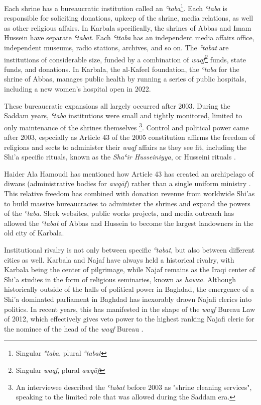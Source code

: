 Each shrine has a bureaucratic institution called an \emph{ʿtaba}\footnote{Singular \emph{ʿtaba}, plural \emph{ʿtabat}}. Each \emph{ʿtaba} is responsible for soliciting donations, upkeep of the shrine, media relations, as well as other religious affairs. In Karbala specifically, the shrines of Abbas and Imam Hussein have separate \emph{ʿtabat}. Each \emph{ʿttaba} has an independent media affairs office, independent museums, radio stations, archives, and so on. The \emph{ʿtabat} are institutions of considerable size, funded by a combination of \emph{waqf}\footnote{Singular \emph{waqf}, plural \emph{awqāf}} funds, state funds, and donations. In Karbala, the al-Kafeel foundation, the \emph{ʿtaba} for the shrine of Abbas, manages public health by running a series of public hospitals, including a new women's hospital open in 2022. 

These bureaucratic expansions all largely occurred after 2003. During the Saddam years, \emph{ʿtaba} institutions were small and tightly monitored, limited to only maintenance of the shrines themselves \footnote{An interviewee described the \emph{ʿtabat} before 2003 as "shrine cleaning services", speaking to the limited role that was allowed during the Saddam era.}. Control and political power came after 2003, especially as Article 43 of the 2005 constitution affirms the freedom of religions and sects to administer their \emph{waqf} affairs as they see fit, including the Shi'a specific rituals, known as the \emph{Shaʿir Husseiniyya}, or Husseini rituals \cite{jawad_iraqi_2003}. 

Haider Ala Hamoudi has mentioned how Article 43 has created an archipelago of diwans (administrative bodies for \emph{awqāf}) rather than a single uniform ministry \cite[220]{hamoudi_engagements_2020}. This relative freedom has combined with donation revenue from worldwide Shi'as to build massive bureaucracies to administer the shrines and expand the powers of the \emph{ʿtaba}. Sleek websites, public works projects, and media outreach has allowed the \emph{ʿtabat} of Abbas and Hussein to become the largest landowners in the old city of Karbala. 

Institutional rivalry is not only between specific \emph{ʿtabat}, but also between different cities as well. Karbala and Najaf have always held a historical rivalry, with Karbala being the center of pilgrimage, while Najaf remains as the Iraqi center of Shi'a studies in the form of religious seminaries, known as \emph{hawza}. Although historically outside of the halls of political power in Baghdad, the emergence of a Shi'a dominated parliament in Baghdad has inexorably drawn Najafi clerics into politics. In recent years, this has manifested in the shape of the \emph{waqf} Bureau Law of 2012, which effectively gives veto power to the highest ranking Najafi cleric for the nominee of the head of the \emph{waqf} Bureau \cite{hamoudi_engagements_2020}.

